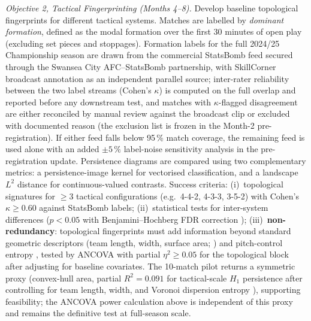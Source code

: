 \textit{Objective 2, Tactical Fingerprinting (Months 4--8).} Develop baseline topological fingerprints for different tactical systems. Matches are labelled by \emph{dominant formation}, defined as the modal formation over the first 30 minutes of open play (excluding set pieces and stoppages). Formation labels for the full 2024/25 Championship season are drawn from the commercial StatsBomb feed secured through the Swansea City AFC--StatsBomb partnership, with SkillCorner broadcast annotation as an independent parallel source; inter-rater reliability between the two label streams (Cohen's $\kappa$) is computed on the full overlap and reported before any downstream test, and matches with \(\kappa\)-flagged disagreement are either reconciled by manual review against the broadcast clip or excluded with documented reason (the exclusion list is frozen in the Month-2 pre-registration). If either feed falls below 95\,\% match coverage, the remaining feed is used alone with an added \(\pm 5\,\%\) label-noise sensitivity analysis in the pre-registration update. Persistence diagrams are compared using two complementary metrics: a persistence-image kernel \citep{Adams2017} for vectorised classification, and a landscape $L^2$ distance \citep{Bubenik2015} for continuous-valued contrasts. Success criteria: (i)~topological signatures for $\geq 3$ tactical configurations (e.g.\ 4-4-2, 4-3-3, 3-5-2) with Cohen's $\kappa \geq 0.60$ against StatsBomb labels; (ii)~statistical tests for inter-system differences ($p < 0.05$ with Benjamini--Hochberg FDR correction \citep{BenjaminiHochberg1995}); (iii)~\textbf{non-redundancy}: topological fingerprints must add information beyond standard geometric descriptors (team length, width, surface area; \citealp{Folgado2014}) and pitch-control entropy \citep{FernandezBornn2018}, tested by ANCOVA with partial $\eta^2 \geq 0.05$ for the topological block after adjusting for baseline covariates. The 10-match pilot returns a symmetric proxy (convex-hull area, partial $R^2 = 0.091$ for tactical-scale $H_1$ persistence after controlling for team length, width, and Voronoi dispersion entropy \citep{Brown2026}), supporting feasibility; the ANCOVA power calculation above is independent of this proxy and remains the definitive test at full-season scale.


